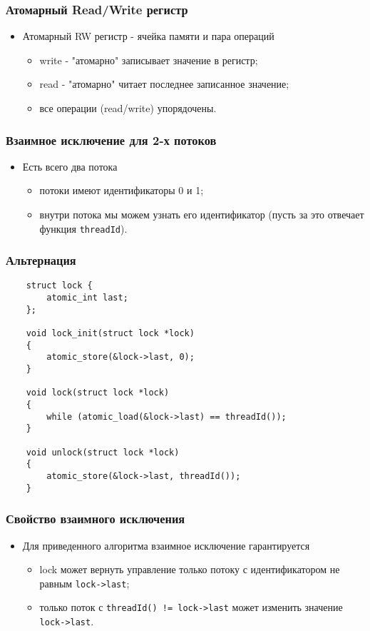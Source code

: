 \begin{frame}
\frametitle{Атомарный Read/Write регистр}
\begin{itemize}
    \item<1->Атомарный RW регистр - ячейка памяти и пара операций
    \begin{itemize}
        \item<2->write - "атомарно" записывает значение в регистр;
        \item<3->read - "атомарно" читает последнее записанное значение;
        \item<4->все операции (read/write) упорядочены.
    \end{itemize}
\end{itemize}
\end{frame}

\begin{frame}
\frametitle{Взаимное исключение для 2-х потоков}
\begin{itemize}
    \item<1->Есть всего два потока
    \begin{itemize}
        \item<2->потоки имеют идентификаторы 0 и 1;
        \item<3->внутри потока мы можем узнать его идентификатор (пусть за
             это отвечает функция \lstinline|threadId|).
    \end{itemize}
\end{itemize}
\end{frame}

\begin{frame}[fragile]
\frametitle{Альтернация}
\begin{lstlisting}
    struct lock {
        atomic_int last;
    };

    void lock_init(struct lock *lock)
    {
        atomic_store(&lock->last, 0);
    }

    void lock(struct lock *lock)
    {
        while (atomic_load(&lock->last) == threadId());
    }

    void unlock(struct lock *lock)
    {
        atomic_store(&lock->last, threadId());
    }
\end{lstlisting}
\end{frame}

\begin{frame}
\frametitle{Свойство взаимного исключения}
\begin{itemize}
    \item<1->Для приведенного алгоритма взаимное исключение гарантируется
    \begin{itemize}
        \item<2->lock может вернуть управление только потоку с
             идентификатором не равным \lstinline|lock->last|;
        \item<3->только поток с \lstinline|threadId() != lock->last| может
             изменить значение \lstinline|lock->last|.
    \end{itemize}
\end{itemize}
\end{frame}

